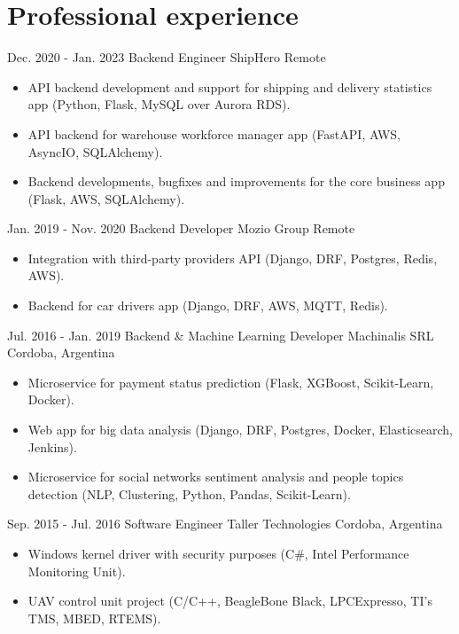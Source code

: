
\section{Professional experience}
  \cventry
    {Dec. 2020 - Jan. 2023} %
    {Backend Engineer} %
    {ShipHero} %
    {Remote} %
    {}
    {
      \begin{itemize} %
        \item {API backend development and support for shipping and delivery statistics app (Python, Flask, MySQL over Aurora RDS).}
        \item {API backend for warehouse workforce manager app (FastAPI, AWS, AsyncIO, SQLAlchemy).}
        \item {Backend developments, bugfixes and improvements for the core business app (Flask, AWS, SQLAlchemy).}
      \end{itemize}
    }
  \cventry
    {Jan. 2019 - Nov. 2020} %
    {Backend Developer} %
    {Mozio Group} %
    {Remote} %
    {}
    {
      \begin{itemize} %
        \item {Integration with third-party providers API (Django, DRF, Postgres, Redis, AWS).}
        \item {Backend for car drivers app (Django, DRF, AWS, MQTT, Redis).}
      \end{itemize}
    }

  \cventry
    {Jul. 2016 - Jan. 2019} %
    {Backend \& Machine Learning Developer} %
    {Machinalis SRL} %
    {Cordoba, Argentina} %
    {}
    {
      \begin{itemize} %
        \item {Microservice for payment status prediction (Flask, XGBoost, Scikit-Learn, Docker).}
        \item {Web app for big data analysis (Django, DRF, Postgres, Docker, Elasticsearch, Jenkins).}
        \item {Microservice for social networks sentiment analysis and people topics detection (NLP, Clustering, Python, Pandas, Scikit-Learn).}
      \end{itemize}
    }

  \cventry
    {Sep. 2015 - Jul. 2016} %
    {Software Engineer} %
    {Taller Technologies} %
    {Cordoba, Argentina} %
    {}
    {
      \begin{itemize} %
        \item {Windows kernel driver with security purposes (C\#, Intel Performance Monitoring Unit).}
        \item {UAV control unit project (C/C++, BeagleBone Black, LPCExpresso, TI's TMS, MBED, RTEMS).}
      \end{itemize}
    }

